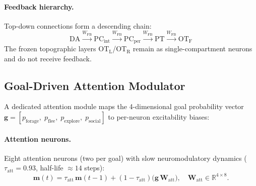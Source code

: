 \documentclass[11pt,a4paper]{article}
\begin{document}
\paragraph{Feedback hierarchy.}
Top-down connections form a descending chain:
\[
  \text{DA} \xrightarrow{W_\text{FB}} \text{PC}_\text{int}
  \xrightarrow{W_\text{FB}} \text{PC}_\text{per}
  \xrightarrow{W_\text{FB}} \text{PT}
  \xrightarrow{W_\text{FB}} \text{OT}_\text{F}
\]
The frozen topographic layers OT$_\text{L}$/OT$_\text{R}$ remain as
single-compartment neurons and do not receive feedback.

\subsection{Goal-Driven Attention Modulator}\label{sec:attention}

A dedicated attention module maps the 4-dimensional goal probability
vector $\mathbf{g} = [p_\text{forage},\;p_\text{flee},\;p_\text{explore},\;p_\text{social}]$
to per-neuron excitability biases:

\paragraph{Attention neurons.}  Eight attention neurons (two per goal)
with slow neuromodulatory dynamics ($\tau_\text{att} = 0.93$,
half-life $\approx 14$ steps):
\begin{equation}\label{eq:att_neuron}
  \mathbf{m}(t) = \tau_\text{att}\,\mathbf{m}(t{-}1)
    + (1 - \tau_\text{att})\bigl(\mathbf{g}\,\mathbf{W}_\text{att}\bigr),
  \quad \mathbf{W}_\text{att} \in \mathbb{R}^{4 \times 8}.
\end{equation}
\end{document}
